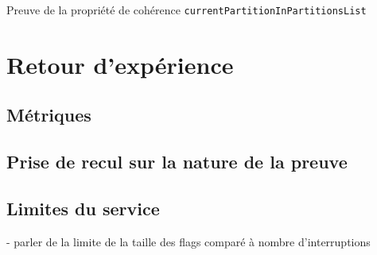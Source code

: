 			\begin{listing}[!ht]
				\caption{Preuve de la propriété de cohérence \texttt{currentPartitionInPartitionsList}}
				\label{code:currentPartitionInPartitionsListActivate}
			\end{listing}


	\section{Retour d'expérience}
		\subsection{Métriques}
		\subsection{Prise de recul sur la nature de la preuve}
		\subsection{Limites du service}
			- parler de la limite de la taille des flags comparé à nombre d'interruptions
